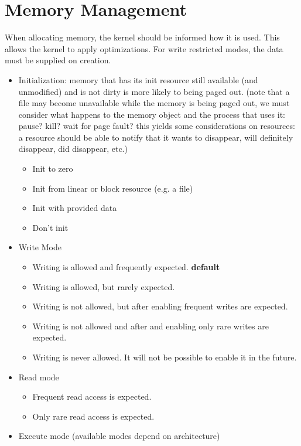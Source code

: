\documentclass[a4paper]{article}
\begin{document}
\section{Memory Management}

When allocating memory, the kernel should be informed how it is used. This allows the kernel to apply optimizations.
For write restricted modes, the data must be supplied on creation.

\begin{itemize}
  \item Initialization: memory that has its init resource still available (and unmodified) and is not dirty is more likely to being paged out. (note that a file may become unavailable while the memory is being paged out, we must consider what happens to the memory object and the process that uses it: pause? kill? wait for page fault? this yields some considerations on resources: a resource should be able to notify that it wants to disappear, will definitely disappear, did disappear, etc.)
    \begin{itemize}
      \item Init to zero
      \item Init from linear or block resource (e.g. a file)
      \item Init with provided data
      \item Don't init
    \end{itemize}
  \item Write Mode
    \begin{itemize}
      \item Writing is allowed and frequently expected. {\bf default}
      \item Writing is allowed, but rarely expected.
      \item Writing is not allowed, but after enabling frequent writes are expected.
      \item Writing is not allowed and after and enabling only rare writes are expected.
      \item Writing is never allowed. It will not be possible to enable it in the future.
    \end{itemize}
  \item Read mode
    \begin{itemize}
      \item Frequent read access is expected.
      \item Only rare read access is expected.
    \end{itemize}
  \item Execute mode (available modes depend on architecture)

\end{itemize}
\end{document}
